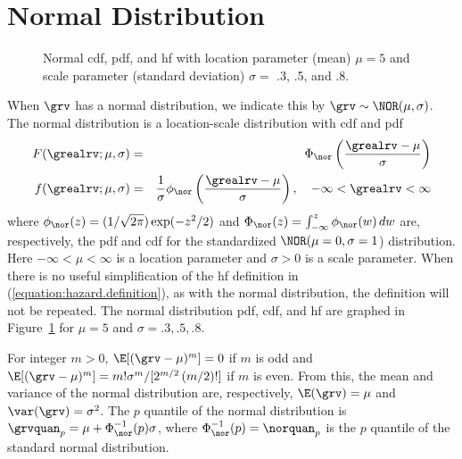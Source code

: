 \section{Normal Distribution}
\label{section:normal.distribution.definition}

\begin{figure}
\caption{Normal cdf, pdf, and hf with 
location parameter (mean)
$\mu=5$ and scale parameter (standard deviation) $\sigma=$ .3, .5, and .8.}
\label{figure:distplot.nor.ps}
\end{figure}
When $\grv$ has a normal distribution, we indicate this by $\grv
\sim \NOR(\mu, \sigma)$.  The normal distribution is a location-scale
distribution with cdf and pdf
\begin{eqnarray*}  
 F(\grealrv;\mu, \sigma)&=&
\Phi_{\nor}\left (\frac{\grealrv-\mu}{\sigma}
\right )
\\
 f(\grealrv;\mu, \sigma)&=&\frac{1}{ \sigma } \phi_{\nor}
\left ( 
\frac{\grealrv-\mu}{\sigma} \right), \quad -\infty < \grealrv < \infty
 \end{eqnarray*} 
where $\phi_{\nor}(z)=(1/\sqrt{2\pi})\exp(-z^2/2)$ and 
$\Phi_{\nor}(z)=\int^{z}_{-\infty}\phi_{\nor}(w) \, dw$ 
are, respectively,
the pdf and cdf for the standardized $\NOR (\mu=0, \sigma=1$)
distribution. Here $-\infty< \mu <
\infty$ is a location parameter and $\sigma > 0$ is a scale parameter.
When there is no useful simplification of the hf
definition in (\ref{equation:hazard.definition}), as with the normal
distribution, the definition will not be repeated.  The normal
distribution pdf, cdf, and hf are graphed in
Figure~\ref{figure:distplot.nor.ps} for $\mu=5$ and $\sigma=.3,
.5,.8$.

For integer $m > 0$, $\E[(\grv-\mu)^{m}]=0$ if $m$ is odd and
$\E[(\grv-\mu)^{m}]= m! \sigma^{m}/[2^{m/2} \, (m/2)!]$ if $m$ is
even.  From this, the mean and variance of the normal
distribution are, respectively, $\E(\grv)= \mu$ and $\var(\grv)=
\sigma^{2}$.  The $p$ quantile  of the normal distribution is
$\grvquan_{p}=\mu +
\Phi^{-1}_{\nor}(p) \sigma$, 
where $\Phi^{-1}_{\nor}(p)=\norquan_{p}$ is the $p$ quantile of the
standard normal distribution.

